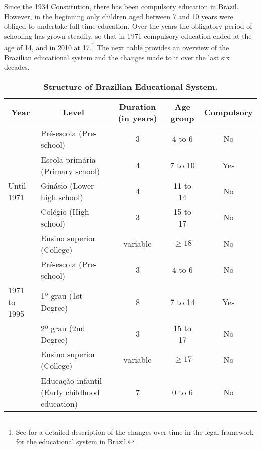 \documentclass[a4paper, 12pt]{article}
\begin{document}
Since the 1934 Constitution, there has been compulsory education in Brazil. However, in the beginning only children aged between 7 and 10 years were obliged to undertake full-time education. Over the years the obligatory period of schooling has grown steadily, so that in 1971 compulsory education ended at the age of 14, and in 2010 at 17.\footnote{See \citet{wjuniski2013education} for a detailed description of the changes over time in the legal framework for the educational system in Brazil.} The next table provides an overview of the Brazilian educational system and the changes made to it over the last six decades.




\begin{table}[H]
  \centering
\caption{\textbf{Structure of Brazilian Educational System.}}
  \begin{adjustbox}{width=\textwidth,totalheight=\textheight,keepaspectratio}
    \begin{tabular}{ccccc}
    \toprule
    \textbf{Year} & \textbf{Level} & \textbf{Duration (in years)} & \textbf{Age group} & \textbf{Compulsory} \\
    \midrule
          & \multicolumn{1}{l}{Pré-escola (Pre-school)} & 3     & 4 to 6 & No \\
          & \multicolumn{1}{l}{Escola primária (Primary school)} & 4     & 7 to 10 & Yes \\
    \multicolumn{1}{l}{Until 1971} & \multicolumn{1}{l}{Ginásio (Lower high school)} & 4     & 11 to 14 & No \\
          & \multicolumn{1}{l}{Colégio (High school)} & 3     & 15 to 17 & No \\
          & \multicolumn{1}{l}{Ensino superior (College)} & variable   & $\geq18$  & No \\
    \midrule
          & \multicolumn{1}{l}{Pré-escola (Pre-school)} & 3     & 4 to 6 & No \\
    \multicolumn{1}{l}{1971 to 1995} & \multicolumn{1}{l}{1º grau (1st Degree)} & 8     & 7 to 14 & Yes \\
          & \multicolumn{1}{l}{2º grau (2nd Degree)} & 3     & 15 to 17 & No \\
          & \multicolumn{1}{l}{Ensino superior (College)} & variable   & $\geq17$  & No \\
    \midrule
          & \multicolumn{1}{l}{Educação infantil (Early childhood education)} & 7     & 0 to 6 & No \\

\end{tabular}
\end{adjustbox}
\end{table}
\end{document}
